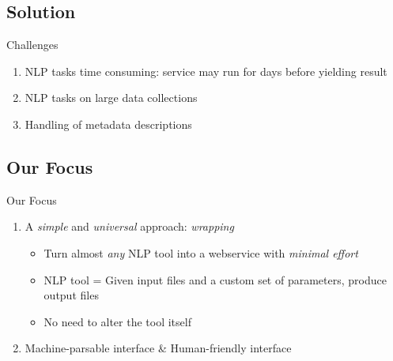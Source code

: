 \documentclass[compress]{beamer}
\begin{document}
\subsection{Solution}
\begin{frame}
    \begin{block}{Challenges} 
        \begin{enumerate}
            \item NLP tasks time consuming: service may run for days before yielding result
            \item NLP tasks on large data collections
            \item Handling of metadata descriptions 
        \end{enumerate}
    \end{block}

\end{frame}



\subsection{Our Focus}
\begin{frame}
    \begin{block}{Our Focus}
   
        \begin{enumerate}
            \item A \emph{simple} and \emph{universal} approach: \emph{wrapping}
            \begin{itemize}
                \item Turn almost \emph{any} NLP tool into a webservice with \emph{minimal effort}
                \item NLP tool = Given input files and a custom set of parameters, produce output files
                \item No need to alter the tool itself %
            \end{itemize}
            \item Machine-parsable interface \& Human-friendly interface
        \end{enumerate}
    
    \end{block}
\end{frame}
\end{document}
